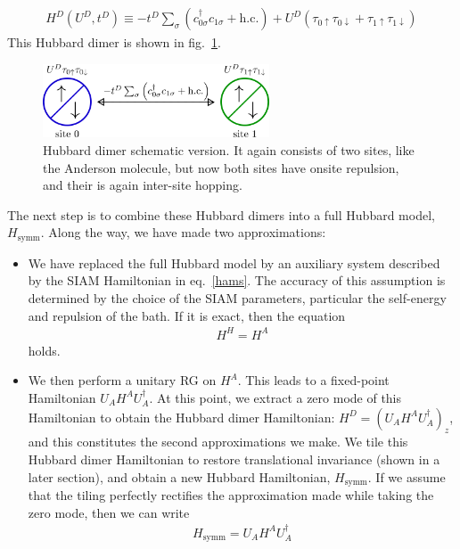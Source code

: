 \documentclass[12pt]{article}
\numberwithin{equation}{section}
\begin{document}
\begin{equation}\begin{aligned}
	H^D(U^D, t^D) \equiv -t^D\sum_\sigma\left( c^\dagger_{0\sigma}c_{1\sigma} + \text{h.c.} \right) + U^D\left( \tau_{0 \uparrow}\tau_{0 \downarrow} + \tau_{1 \uparrow}\tau_{1 \downarrow}\right)
\end{aligned}\end{equation}
This Hubbard dimer is shown in fig.~\ref{hubb-dim}.
\begin{figure}[htpb!]
	\centering
	\includegraphics[width=0.6\textwidth]{./hubb_dim.png}
	\caption{Hubbard dimer schematic version. It again consists of two sites, like the Anderson molecule, but now both sites have onsite repulsion, and their is again inter-site hopping.}
	\label{hubb-dim}
\end{figure}
The next step is to combine these Hubbard dimers into a full Hubbard model, $H_\text{symm}$. Along the way, we have made two approximations:
\begin{itemize}
	\item We have replaced the full Hubbard model by an auxiliary system described by the SIAM Hamiltonian in eq.~\ref{hams}. The accuracy of this assumption is determined by the choice of the SIAM parameters, particular the self-energy and repulsion of the bath. If it is exact, then the equation
\begin{equation}\begin{aligned}
	\label{app1}
	H^H = H^A
\end{aligned}\end{equation}
holds.
	\item We then perform a unitary RG on $H^A$. This leads to a fixed-point Hamiltonian $U_A H^A U_A^\dagger$. At this point, we extract a zero mode of this Hamiltonian to obtain the Hubbard dimer Hamiltonian: $H^D = \left(U_A H^A U_A^\dagger\right)_z$, and this constitutes the second approximations we make. We tile this Hubbard dimer Hamiltonian to restore translational invariance (shown in a later section), and obtain a new Hubbard Hamiltonian, $H_\text{symm}$. If we assume that the tiling perfectly rectifies the approximation made while taking the zero mode, then we can write
\begin{equation}\begin{aligned}
	\label{app2}
	H_\text{symm} = U_A H^A U_A^\dagger
\end{aligned}\end{equation}
\end{itemize}
\end{document}
